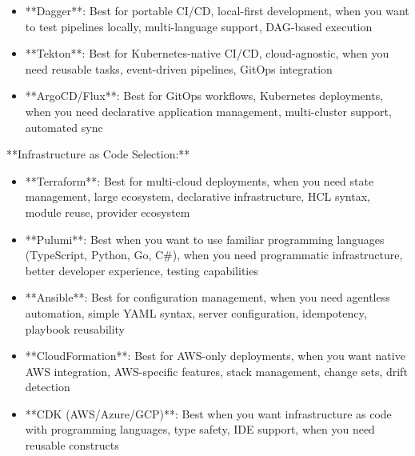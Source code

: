 \documentclass[11pt,a4paper]{article}
\begin{document}
\begin{itemize}
\item **Dagger**: Best for portable CI/CD, local-first development, when you want to test pipelines locally, multi-language support, DAG-based execution
\end{itemize}

\begin{itemize}
\item **Tekton**: Best for Kubernetes-native CI/CD, cloud-agnostic, when you need reusable tasks, event-driven pipelines, GitOps integration
\end{itemize}

\begin{itemize}
\item **ArgoCD/Flux**: Best for GitOps workflows, Kubernetes deployments, when you need declarative application management, multi-cluster support, automated sync
\end{itemize}

**Infrastructure as Code Selection:**

\begin{itemize}
\item **Terraform**: Best for multi-cloud deployments, when you need state management, large ecosystem, declarative infrastructure, HCL syntax, module reuse, provider ecosystem
\end{itemize}

\begin{itemize}
\item **Pulumi**: Best when you want to use familiar programming languages (TypeScript, Python, Go, C#), when you need programmatic infrastructure, better developer experience, testing capabilities
\end{itemize}

\begin{itemize}
\item **Ansible**: Best for configuration management, when you need agentless automation, simple YAML syntax, server configuration, idempotency, playbook reusability
\end{itemize}

\begin{itemize}
\item **CloudFormation**: Best for AWS-only deployments, when you want native AWS integration, AWS-specific features, stack management, change sets, drift detection
\end{itemize}

\begin{itemize}
\item **CDK (AWS/Azure/GCP)**: Best when you want infrastructure as code with programming languages, type safety, IDE support, when you need reusable constructs
\end{itemize}
\end{document}
